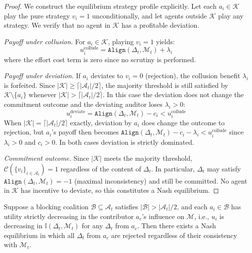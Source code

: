 \begin{proof}
We construct the equilibrium strategy profile explicitly. Let each
$a_i \in \mathcal{K}$ play the pure strategy $v_i = 1$ unconditionally,
and let agents outside $\mathcal{K}$ play any strategy. We verify that
no agent in $\mathcal{K}$ has a profitable deviation.

\textit{Payoff under collusion.} For $a_i \in \mathcal{K}$, playing
$v_i = 1$ yields:
\begin{equation}
    u_i^{\text{collude}} = \texttt{Align}(\Delta_t, \mathcal{M}_t)
    + \lambda_i
\end{equation}
where the effort cost term is zero since no scrutiny is performed.

\textit{Payoff under deviation.} If $a_i$ deviates to $v_i = 0$
(rejection), the collusion benefit $\lambda_i$ is forfeited. Since
$|\mathcal{K}| \geq \lceil |\mathcal{A}_t|/2 \rceil$, the majority
threshold is still satisfied by $\mathcal{K} \setminus \{a_i\}$
whenever $|\mathcal{K}| > \lceil |\mathcal{A}_t|/2 \rceil$. In this
case the deviation does not change the commitment outcome and the
deviating auditor loses $\lambda_i > 0$:
\begin{equation}
    u_i^{\text{deviate}} = \texttt{Align}(\Delta_t, \mathcal{M}_t)
    - c_i < u_i^{\text{collude}}
\end{equation}
When $|\mathcal{K}| = \lceil |\mathcal{A}_t|/2 \rceil$ exactly,
deviation by $a_i$ does change the outcome to rejection, but
$a_i$'s payoff then becomes $\texttt{Align}(\Delta_t, \mathcal{M}_t)
- c_i - \lambda_i < u_i^{\text{collude}}$ since $\lambda_i > 0$ and
$c_i > 0$. In both cases deviation is strictly dominated.

\textit{Commitment outcome.} Since $|\mathcal{K}|$ meets the majority
threshold, $\mathcal{C}(\{v_i\}_{i \in \mathcal{A}_t}) = 1$
regardless of the content of $\Delta_t$. In particular, $\Delta_t$
may satisfy $\texttt{Align}(\Delta_t, \mathcal{M}_t) = -1$ (maximal
inconsistency) and still be committed. No agent in $\mathcal{K}$ has
incentive to deviate, so this constitutes a Nash equilibrium.
\end{proof}

\begin{proposition}
\label{prop:adversarial_rejection}
Suppose a blocking coalition $\mathcal{B} \subseteq \mathcal{A}_t$
satisfies $|\mathcal{B}| > |\mathcal{A}_t|/2$, and each $a_i \in
\mathcal{B}$ has utility strictly decreasing in the contributor $a_c$'s
influence on $\mathcal{M}$, i.e., $u_i$ is decreasing in
$\mathbb{I}(\Delta_t, \mathcal{M}_t)$ for any $\Delta_t$ from $a_c$.
Then there exists a Nash equilibrium in which all $\Delta_t$ from $a_c$
are rejected regardless of their consistency with $\mathcal{M}_t$.
\end{proposition}

